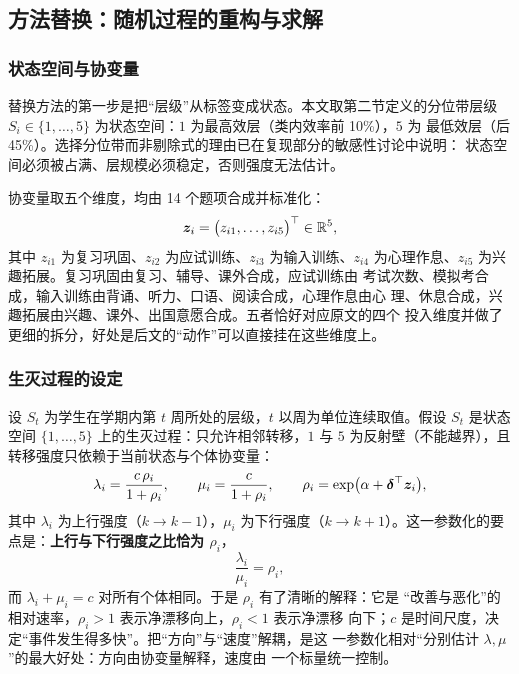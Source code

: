 \subsection{方法替换：随机过程的重构与求解}

\subsubsection{状态空间与协变量}

替换方法的第一步是把“层级”从标签变成状态。本文取第二节定义的分位带层级
$S_i\in\{1,\dots,5\}$ 为状态空间：$1$ 为最高效层（类内效率前 10\%），$5$ 为
最低效层（后 45\%）。选择分位带而非剔除式的理由已在复现部分的敏感性讨论中说明：
状态空间必须被占满、层规模必须稳定，否则强度无法估计。

协变量取五个维度，均由 14 个题项合成并标准化：
\begin{equation}
\bm{z}_i=\bigl(z_{i1},\dots,z_{i5}\bigr)^{\top}\in\mathbb{R}^{5},
\label{eq:cov}
\end{equation}
其中 $z_{i1}$ 为复习巩固、$z_{i2}$ 为应试训练、$z_{i3}$ 为输入训练、$z_{i4}$
为心理作息、$z_{i5}$ 为兴趣拓展。复习巩固由复习、辅导、课外合成，应试训练由
考试次数、模拟考合成，输入训练由背诵、听力、口语、阅读合成，心理作息由心
理、休息合成，兴趣拓展由兴趣、课外、出国意愿合成。五者恰好对应原文的四个
投入维度并做了更细的拆分，好处是后文的“动作”可以直接挂在这些维度上。

\subsubsection{生灭过程的设定}

设 $S_t$ 为学生在学期内第 $t$ 周所处的层级，$t$ 以周为单位连续取值。假设
$S_t$ 是状态空间 $\{1,\dots,5\}$ 上的生灭过程：只允许相邻转移，$1$ 与 $5$
为反射壁（不能越界），且转移强度只依赖于当前状态与个体协变量：
\begin{equation}
\lambda_i=\frac{c\,\rho_i}{1+\rho_i},\qquad
\mu_i=\frac{c}{1+\rho_i},\qquad
\rho_i=\exp\bigl(\alpha+\bm{\delta}^{\top}\bm{z}_i\bigr),
\label{eq:bd}
\end{equation}
其中 $\lambda_i$ 为上行强度（$k\to k-1$），$\mu_i$ 为下行强度（$k\to
k+1$）。这一参数化的要点是：\textbf{上行与下行强度之比恰为 $\rho_i$}，
\begin{equation}
\frac{\lambda_i}{\mu_i}=\rho_i ,
\label{eq:ratio}
\end{equation}
而 $\lambda_i+\mu_i=c$ 对所有个体相同。于是 $\rho_i$ 有了清晰的解释：它是
“改善与恶化”的相对速率，$\rho_i>1$ 表示净漂移向上，$\rho_i<1$ 表示净漂移
向下；$c$ 是时间尺度，决定“事件发生得多快”。把“方向”与“速度”解耦，是这
一参数化相对“分别估计 $\lambda,\mu$”的最大好处：方向由协变量解释，速度由
一个标量统一控制。

